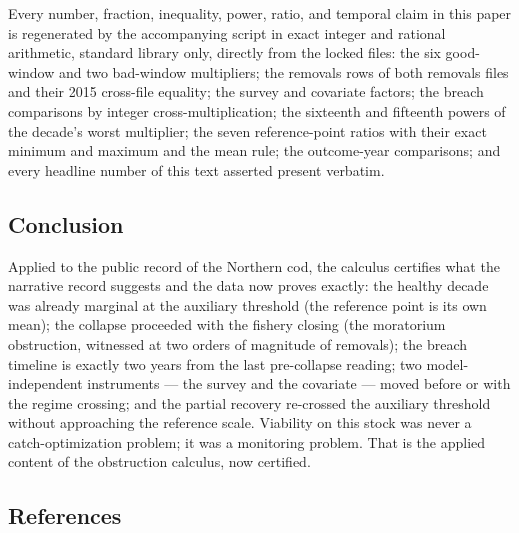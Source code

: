 \documentclass[10pt,twocolumn]{article}
\theoremstyle{plain}
\theoremstyle{remark}
\begin{document}
Every number, fraction, inequality, power, ratio, and temporal claim in
this paper is regenerated by the accompanying script in exact integer
and rational arithmetic, standard library only, directly from the
locked files: the six good-window and two bad-window multipliers; the
removals rows of both removals files and their 2015 cross-file
equality; the survey and covariate factors; the breach comparisons by
integer cross-multiplication; the sixteenth and fifteenth powers of the
decade's worst multiplier; the seven reference-point ratios with their
exact minimum and maximum and the mean rule; the outcome-year
comparisons; and every headline number of this text asserted present
verbatim.

\subsection{Conclusion}\label{conclusion}

Applied to the public record of the Northern cod, the calculus
certifies what the narrative record suggests and the data now proves
exactly: the healthy decade was already marginal at the auxiliary
threshold (the reference point is its own mean); the collapse proceeded
with the fishery closing (the moratorium obstruction, witnessed at two
orders of magnitude of removals); the breach timeline is exactly two
years from the last pre-collapse reading; two model-independent
instruments --- the survey and the covariate --- moved before or with
the regime crossing; and the partial recovery re-crossed the auxiliary
threshold without approaching the reference scale. Viability on this
stock was never a catch-optimization problem; it was a monitoring
problem. That is the applied content of the obstruction calculus, now
certified.

\subsection*{References}
\end{document}
